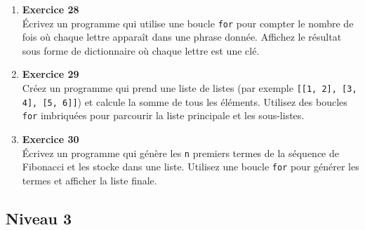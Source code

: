 \documentclass{article}
\begin{document}
\begin{enumerate}
    \item \textbf{Exercice 28} \\
    Écrivez un programme qui utilise une boucle \texttt{for} pour compter le nombre de fois où chaque lettre apparaît dans une phrase donnée. Affichez le résultat sous forme de dictionnaire où chaque lettre est une clé.

    \item \textbf{Exercice 29} \\
    Créez un programme qui prend une liste de listes (par exemple \texttt{[[1, 2], [3, 4], [5, 6]]}) et calcule la somme de tous les éléments. Utilisez des boucles \texttt{for} imbriquées pour parcourir la liste principale et les sous-listes.

    \item \textbf{Exercice 30} \\
    Écrivez un programme qui génère les \texttt{n} premiers termes de la séquence de Fibonacci et les stocke dans une liste. Utilisez une boucle \texttt{for} pour générer les termes et afficher la liste finale.

\end{enumerate}



\subsection{Niveau 3}
\end{document}
